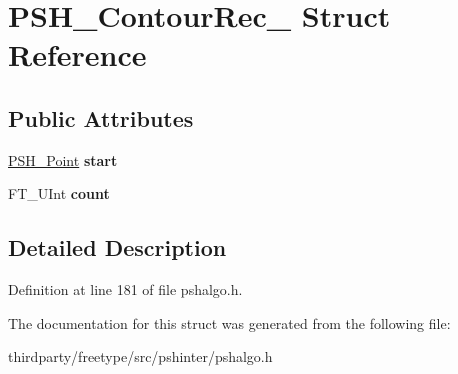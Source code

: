 \hypertarget{struct_p_s_h___contour_rec__}{}\section{P\+S\+H\+\_\+\+Contour\+Rec\+\_\+ Struct Reference}
\label{struct_p_s_h___contour_rec__}
\subsection*{Public Attributes}
\begin{DoxyCompactItemize}
\item 
\mbox{\label{struct_p_s_h___contour_rec___ada292eef1584e5f887bea69ba8703aa2}} 
\hyperlink{struct_p_s_h___point_rec__}{P\+S\+H\+\_\+\+Point} {\bfseries start}
\item 
\mbox{\label{struct_p_s_h___contour_rec___a5d45ebbfcc7c5cb394ddae2e1b9dacf3}} 
F\+T\+\_\+\+U\+Int {\bfseries count}
\end{DoxyCompactItemize}


\subsection{Detailed Description}


Definition at line 181 of file pshalgo.\+h.



The documentation for this struct was generated from the following file\+:\begin{DoxyCompactItemize}
\item 
thirdparty/freetype/src/pshinter/pshalgo.\+h\end{DoxyCompactItemize}
